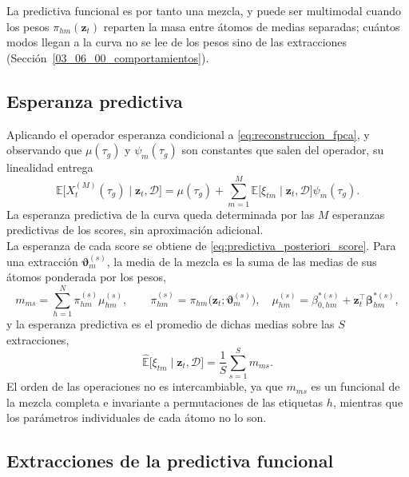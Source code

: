La predictiva funcional es por tanto una mezcla, y puede ser multimodal cuando los pesos $\pi_{hm}(\mathbf{z}_t)$ reparten la masa entre átomos de medias separadas; cuántos modos llegan a la curva no se lee de los pesos sino de las extracciones (Sección~\ref{03_06_00_comportamientos}).

\subsection{Esperanza predictiva}
\label{03_05_01_esperanza}

Aplicando el operador esperanza condicional a \eqref{eq:reconstruccion_fpca}, y observando que $\mu(\tau_g)$ y $\psi_m(\tau_g)$ son constantes que salen del operador, su linealidad entrega
\begin{equation}\label{eq:esperanza_curva}
    \mathbb{E}\bigl[X_t^{(M)}(\tau_g) \mid \mathbf{z}_t, \mathcal{D}\bigr]
    = \mu(\tau_g)
    + \sum_{m=1}^{M} \mathbb{E}\bigl[\xi_{tm} \mid \mathbf{z}_t, \mathcal{D}\bigr]\psi_m(\tau_g).
\end{equation}
La esperanza predictiva de la curva queda determinada por las $M$ esperanzas predictivas de los scores, sin aproximación adicional.\\

La esperanza de cada score se obtiene de \eqref{eq:predictiva_posteriori_score}. Para una extracción $\boldsymbol{\vartheta}_m^{(s)}$, la media de la mezcla es la suma de las medias de sus átomos ponderada por los pesos,
\begin{equation}\label{eq:momento1_iteracion}
    m_{ms} = \sum_{h=1}^{N} \pi_{hm}^{(s)}\mu_{hm}^{(s)},
    \qquad
    \pi_{hm}^{(s)} = \pi_{hm}\bigl(\mathbf{z}_t; \boldsymbol{\vartheta}_m^{(s)}\bigr),
    \quad
    \mu_{hm}^{(s)} = \beta_{0,hm}^{*(s)} + \mathbf{z}_t^\top\boldsymbol{\beta}_{hm}^{*(s)},
\end{equation}
y la esperanza predictiva es el promedio de dichas medias sobre las $S$ extracciones,
\begin{equation}\label{eq:esperanza_score_estimada}
    \widehat{\mathbb{E}}\bigl[\xi_{tm} \mid \mathbf{z}_t, \mathcal{D}\bigr]
    = \frac{1}{S}\sum_{s=1}^{S} m_{ms}.
\end{equation}
El orden de las operaciones no es intercambiable, ya que $m_{ms}$ es un funcional de la mezcla completa e invariante a permutaciones de las etiquetas $h$, mientras que los parámetros individuales de cada átomo no lo son.\\


\subsection{Extracciones de la predictiva funcional}
\label{03_05_03_extracciones}

